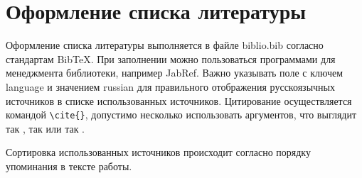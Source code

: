 \section{Оформление списка литературы}

Оформление списка литературы выполняется в файле biblio.bib согласно стандартам BibTeX. При заполнении можно пользоваться программами для менеджмента библиотеки, например JabRef. Важно указывать поле с ключем language и значением russian для правильного отображения русскоязычных источников в списке использованных источников. Цитирование осуществляется командой \verb|\cite{}|, допустимо несколько использовать аргументов, что выглядит так \cite{OneAuthor,TwoAuthor,FourAuthor}, так \cite{TwoAuthor,InProc,FourArticle} или так \cite{Artic,PHD}.

Сортировка использованных источников происходит согласно порядку упоминания в тексте работы.